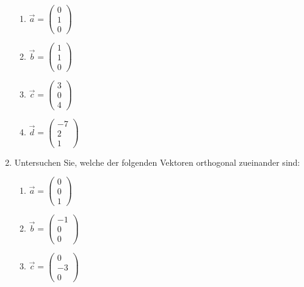 \documentclass[12pt,a4paper,twoside,fleqn]{article}
\begin{document}
\begin{enumerate}
  \begin{multicols}{4}
    \begin{enumerate}
    \item $\vec{a}=  
      \begin{pmatrix}
        0\\1\\0
      \end{pmatrix}
      $
    \item $\vec{b}=  
      \begin{pmatrix}
        1\\1\\0
      \end{pmatrix}
      $
    \item $\vec{c}=  
      \begin{pmatrix}
        3\\0\\4
      \end{pmatrix}
      $
    \item $\vec{d}=  
      \begin{pmatrix}
        -7\\2\\1
      \end{pmatrix}
      $
    \end{enumerate}
  \end{multicols}
\item Untersuchen Sie, welche der folgenden Vektoren orthogonal
  zueinander sind:
  
  \begin{multicols}{3}
    \begin{enumerate}
    \item $\vec{a}=  
      \begin{pmatrix}
        0\\0\\1
      \end{pmatrix}
      $
    \item $\vec{b}=  
      \begin{pmatrix}
        -1\\0\\0
      \end{pmatrix}
      $
    \item $\vec{c}=  
      \begin{pmatrix}
        0\\-3\\0
      \end{pmatrix}
      $
     \end{enumerate}
  \end{multicols}
  
\end{enumerate}
\end{document}
